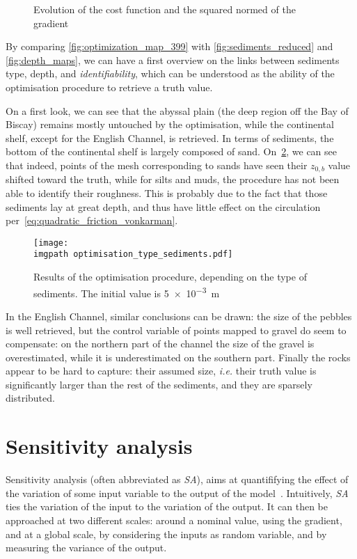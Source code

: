 \documentclass[../../Main_ManuscritThese.tex]{subfiles}
\newcommand{\zob}{z_{0,b}}
\newcommand\imgpath{/home/victor/acadwriting/Manuscrit/Text/Chapter5/img/}
\begin{document}
 \begin{figure}[ht]
  \centering
  
  \caption{\label{fig:ctrl_true} Evolution of the cost function and the squared normed of the gradient}
\end{figure}
By comparing \cref{fig:optimization_map_399} with
\cref{fig:sediments_reduced} and \cref{fig:depth_maps}, we can have a
first overview on the links between sediments type, depth, and
\emph{identifiability}, which can be understood as the ability of the
optimisation procedure to retrieve a truth value.

On a first look, we can see that the abyssal plain (the deep region
off the Bay of Biscay) remains mostly untouched by the optimisation,
while the continental shelf, except for the English Channel, is
retrieved. In terms of sediments, the bottom of the continental shelf
is largely composed of sand.
On~\cref{fig:optimisation_type_sediments}, we can see that indeed,
points of the mesh corresponding to sands have seen their $\zob$ value
shifted toward the truth, while for silts and muds, the procedure has
not been able to identify their roughness. This is probably due to the
fact that those sediments lay at great depth, and thus have little
effect on the circulation per~\cref{eq:quadratic_friction_vonkarman}.
%
%
\begin{figure}[ht]
  \centering
  \texttt{[image: \\imgpath optimisation\_type\_sediments.pdf]}
  \caption{\label{fig:optimisation_type_sediments} Results of the optimisation procedure, depending on the type of sediments. The initial value is \SI{5e-3}{\meter}}
\end{figure}

In the English Channel, similar conclusions can be drawn: the size of
the pebbles is well retrieved, but the control variable of points
mapped to gravel do seem to compensate: on the northern part of the
channel the size of the gravel is overestimated, while it is
underestimated on the southern part.  Finally the rocks appear to be
hard to capture: their assumed size, \emph{i.e.} their truth value is
significantly larger than the rest of the sediments, and they are
sparsely distributed.
%   


\section{Sensitivity analysis}
\label{sec:sensitivity-analysis}
Sensitivity analysis (often abbreviated as \emph{SA}), aims at
quantififying the effect of the variation of some input variable to
the output of the model~\cite{iooss_revue_2011,janon_analyse_2012}.
Intuitively, \emph{SA} ties the variation of the input to the
variation of the output. It can then be approached at two different
scales: around a nominal value, using the gradient, and at a global
scale, by considering the inputs as random variable, and by measuring
the variance of the output.
\end{document}
